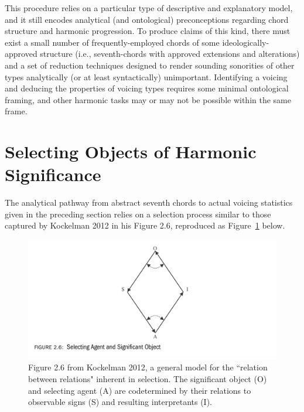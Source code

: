 This procedure relies on a particular type of descriptive and explanatory model, and it still encodes analytical (and ontological) preconceptions regarding chord structure and harmonic progression.  To produce claims of this kind, there must exist a small number of frequently-employed chords of some ideologically-approved structure (i.e., seventh-chords with approved extensions and alterations) and a set of reduction techniques designed to render sounding sonorities of other types analytically (or at least syntactically) unimportant.  Identifying a voicing and deducing the properties of voicing types requires some minimal ontological framing, and other harmonic tasks may or may not be possible within the same frame.

\section{Selecting Objects of Harmonic Significance}
The analytical pathway from abstract seventh chords to actual voicing statistics given in the preceding section relies on a selection process similar to those captured by Kockelman 2012 in his Figure 2.6, reproduced as Figure~\ref{kockelman} below. 

\begin{figure}[h]
	\centering
	\includegraphics[width=6in]{kockelman_model.jpg}
	\caption{Figure 2.6 from Kockelman 2012, a general model for the ``relation between relations" inherent in selection.  The significant object (O) and selecting agent (A) are codetermined by their relations to observable signs (S) and resulting interpretants (I).}
	\label{kockelman}
\end{figure}

